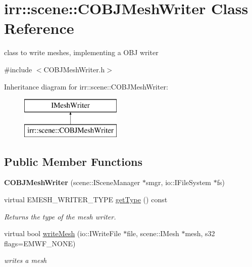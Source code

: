 \hypertarget{classirr_1_1scene_1_1_c_o_b_j_mesh_writer}{\section{irr\-:\-:scene\-:\-:C\-O\-B\-J\-Mesh\-Writer Class Reference}
\label{classirr_1_1scene_1_1_c_o_b_j_mesh_writer}
}


class to write meshes, implementing a O\-B\-J writer  




{\ttfamily \#include $<$C\-O\-B\-J\-Mesh\-Writer.\-h$>$}

Inheritance diagram for irr\-:\-:scene\-:\-:C\-O\-B\-J\-Mesh\-Writer\-:\begin{figure}[H]
\begin{center}
\leavevmode
\includegraphics[height=2.000000cm]{classirr_1_1scene_1_1_c_o_b_j_mesh_writer}
\end{center}
\end{figure}
\subsection*{Public Member Functions}
\begin{DoxyCompactItemize}
\item 
\hypertarget{classirr_1_1scene_1_1_c_o_b_j_mesh_writer_ac800cc7f62797da615301841542e8f37}{{\bfseries C\-O\-B\-J\-Mesh\-Writer} (scene\-::\-I\-Scene\-Manager $\ast$smgr, io\-::\-I\-File\-System $\ast$fs)}\label{classirr_1_1scene_1_1_c_o_b_j_mesh_writer_ac800cc7f62797da615301841542e8f37}

\item 
\hypertarget{classirr_1_1scene_1_1_c_o_b_j_mesh_writer_a419847cbc8162eece621ccd720db324a}{virtual E\-M\-E\-S\-H\-\_\-\-W\-R\-I\-T\-E\-R\-\_\-\-T\-Y\-P\-E \hyperlink{classirr_1_1scene_1_1_c_o_b_j_mesh_writer_a419847cbc8162eece621ccd720db324a}{get\-Type} () const }\label{classirr_1_1scene_1_1_c_o_b_j_mesh_writer_a419847cbc8162eece621ccd720db324a}

\begin{DoxyCompactList}\small\item\em Returns the type of the mesh writer. \end{DoxyCompactList}\item 
\hypertarget{classirr_1_1scene_1_1_c_o_b_j_mesh_writer_a5665f5f1395ae86d321f5547df880d5d}{virtual bool \hyperlink{classirr_1_1scene_1_1_c_o_b_j_mesh_writer_a5665f5f1395ae86d321f5547df880d5d}{write\-Mesh} (io\-::\-I\-Write\-File $\ast$file, scene\-::\-I\-Mesh $\ast$mesh, s32 flags=E\-M\-W\-F\-\_\-\-N\-O\-N\-E)}\label{classirr_1_1scene_1_1_c_o_b_j_mesh_writer_a5665f5f1395ae86d321f5547df880d5d}

\begin{DoxyCompactList}\small\item\em writes a mesh \end{DoxyCompactList}\end{DoxyCompactItemize}
